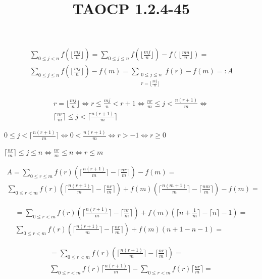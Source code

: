 \documentclass{article}
\title{TAOCP 1.2.4\mbox{-}45}
\begin{document}
\maketitle

\begin{multline*}
\sum_{0 \leq j < n}{f(\lfloor{\frac{mj}{n}}\rfloor)} = \sum_{0 \leq j \leq n}{f(\lfloor{\frac{mj}{n}}\rfloor)} - f(\lfloor{\frac{mn}{n}}\rfloor) = \\
\sum_{0 \leq j \leq n}{f(\lfloor{\frac{mj}{n}}\rfloor)} - f(m) = \sum_{\substack{0 \leq j \leq n \\ r = \lfloor{\frac{mj}{n}} \rfloor}} {f(r)} - f(m) =: A
\end{multline*}

\begin{multline*}
r = \lfloor{\frac{mj}{n}}\rfloor \iff r \leq \frac{mj}{n} < r + 1 \iff \frac{nr}{m} \leq j < \frac{n(r+1)}{m} \iff \\
\lceil{\frac{nr}{m}}\rceil \leq j < \lceil{\frac{n(r+1)}{m}}\rceil
\end{multline*}

\( 0 \leq j < \lceil{\frac{n(r+1)}{m}}\rceil \iff 0 < \frac{n(r+1)}{m} \iff r > -1 \iff r \geq 0 \)

\( \lceil{\frac{nr}{m}}\rceil \leq j \leq n \iff \frac{nr}{m} \leq n \iff r \leq m \)

\begin{multline*}
A = \sum_{0 \leq r \leq m} f(r) (\lceil{\frac{n(r+1)}{m}}\rceil - \lceil{\frac{nr}{m}}\rceil) - f(m) = \\
\sum_{0 \leq r < m} f(r) (\lceil{\frac{n(r+1)}{m}}\rceil - \lceil{\frac{nr}{m}}\rceil) + f(m) (\lceil{\frac{n(m+1)}{m}}\rceil - \lceil{\frac{nm}{m}}\rceil) - f(m) =
\end{multline*}

\begin{multline*}
= \sum_{0 \leq r < m} f(r) (\lceil{\frac{n(r+1)}{m}}\rceil - \lceil{\frac{nr}{m}}\rceil) + f(m)(\lceil{n+\frac{1}{m}}\rceil - \lceil{n}\rceil - 1) = \\
\sum_{0 \leq r < m} f(r) (\lceil{\frac{n(r+1)}{m}}\rceil - \lceil{\frac{nr}{m}}\rceil) + f(m)(n+1 - n - 1) =
\end{multline*}

\begin{multline*}
= \sum_{0 \leq r < m} f(r) (\lceil{\frac{n(r+1)}{m}}\rceil - \lceil{\frac{nr}{m}}\rceil) = \\
\sum_{0 \leq r < m} f(r) \lceil{\frac{n(r+1)}{m}}\rceil - \sum_{0 \leq r < m} f(r) \lceil{\frac{nr}{m}}\rceil =
\end{multline*}
\end{document}
